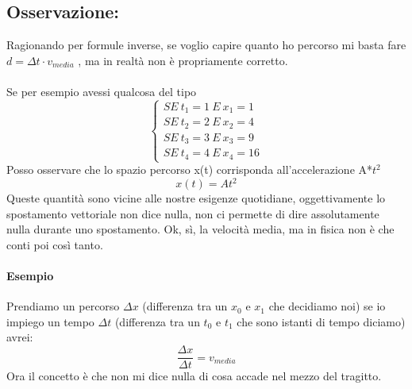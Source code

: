 \documentclass[12pt, a4paper, openany, oneside]{book}
\begin{document}
\subsection*{Osservazione:}
Ragionando per formule inverse, se voglio capire quanto ho percorso mi basta 
fare $d = \Delta t \cdot v_{media}$ , ma in realtà non è propriamente corretto. 
\\ \\
Se per esempio avessi qualcosa del tipo
\[
\begin{cases}
SE ~ t_{1} = 1 ~ E ~ x_{1} = 1  \\ 
SE ~ t_{2} = 2 ~ E ~ x_{2} = 4  \\ 
SE ~ t_{3} = 3 ~ E ~ x_{3} = 9  \\
SE ~ t_{4} = 4 ~ E ~ x_{4} = 16 
\end{cases}\]
Posso osservare che lo spazio percorso x(t) corrisponda all'accelerazione A*$t^{2}$
\[x(t) = At^{2}\]
Queste quantità sono vicine alle nostre esigenze quotidiane, oggettivamente lo
spostamento vettoriale non dice nulla, non ci permette di dire assolutamente
nulla durante uno spostamento. Ok, sì, la velocità media, ma in fisica non è che
conti poi così tanto.
\paragraph{Esempio}	
Prendiamo un percorso $\Delta x$ (differenza tra un $x_{0} $ e $x_{1}$ che
decidiamo noi) se io impiego un tempo $\Delta t$ (differenza tra un $t_{0} $ e 
$t_{1}$ che sono istanti di tempo diciamo) avrei: $$\frac{\Delta x}{\Delta t} 
= v_{media}$$ Ora il concetto è che non mi dice nulla di cosa accade nel mezzo
del tragitto. 
\end{document}
